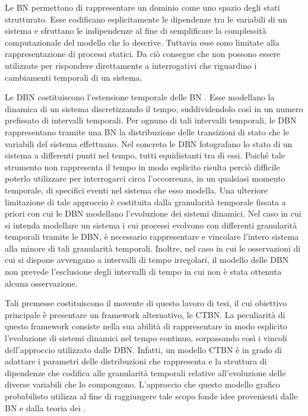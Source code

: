 Le \acf{BN}
\citep{Pearl1988}
permettono di rappresentare un dominio come uno spazio degli stati strutturato.
Esse codificano esplicitamente le dipendenze tra le variabili di un sistema e sfruttano le indipendenze al fine di semplificare la complessità computazionale del modello che lo descrive.
Tuttavia esse sono limitate alla rappresentazione di processi statici.
Da ciò consegue che non possono essere utilizzate per rispondere direttamente a interrogativi che riguardino i cambiamenti temporali di un sistema.

Le \acf{DBN} costituiscono l'estensione temporale delle \acl{BN}
\citep{Dean1989}
. Esse modellano la dinamica di un sistema discretizzando il tempo, suddividendolo così in un numero prefissato di intervalli temporali.
Per ognuno di tali intervalli temporali, le \acl{DBN} rappresentano tramite una \acl{BN} la distribuzione delle transizioni di stato che le variabili del sistema effettuano.
Nel concreto le \acf{DBN} fotografano lo stato di un sistema a differenti punti nel tempo, tutti equidistanti tra di essi.
Poiché tale strumento non rappresenta il tempo in modo esplicito risulta perciò difficile poterlo utilizzare per interrogarci circa l'occorrenza, in un qualsiasi momento temporale, di specifici eventi nel sistema che esso modella.
Una ulteriore limitazione di tale approccio è costituita dalla granularità temporale fissata a priori con cui le \acl{DBN} modellano l'evoluzione dei sistemi dinamici.
Nel caso in cui si intenda modellare un sistema i cui processi evolvono con differenti granularità temporali tramite le \acl{DBN}, è necessario rappresentare e vincolare l'intero sistema alla minore di tali granularità temporali.
Inoltre, nel caso in cui le osservazioni di cui si dispone avvengano a intervalli di tempo irregolari, il modello delle \acl{DBN} non prevede l'esclusione degli intervalli di tempo in cui non è stata ottenuta alcuna osservazione.

Tali premesse costituiscono il movente di questo lavoro di tesi, il cui obiettivo principale è presentare un framework alternativo, le \acf{CTBN}.
La peculiarità di questo framework consiste nella sua abilità di rappresentare in modo esplicito l'evoluzione di sistemi dinamici nel tempo continuo, sorpassando così i vincoli dell'approccio utilizzato dalle \acl{DBN}.
Infatti, un modello \acl{CTBN} è in grado di adattare i parametri delle distribuzioni che rappresenta e la struttura di dipendenze che codifica alle granularità temporali relative all'evoluzione delle diverse variabili che lo compongono.
L'approccio che questo modello grafico probabilisto utilizza al fine di raggiungere tale scopo fonde idee provenienti dalle \acl{BN} e dalla teoria dei \mprocess{}.

